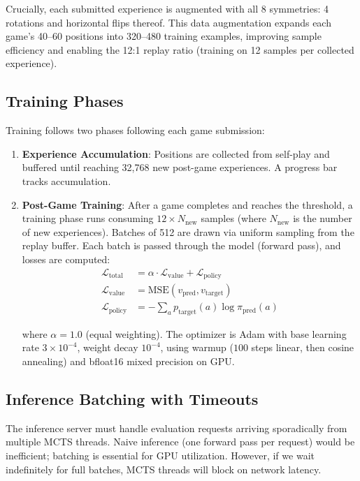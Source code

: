 \documentclass[12pt]{article}
\begin{document}
Crucially, each submitted experience is augmented with all 8 symmetries: 4 rotations and horizontal flips thereof. This data augmentation expands each game's 40--60 positions into 320--480 training examples, improving sample efficiency and enabling the 12:1 replay ratio (training on 12 samples per collected experience).

\subsection{Training Phases}

Training follows two phases following each game submission:

\begin{enumerate}
    \item \textbf{Experience Accumulation}: Positions are collected from self-play and buffered until reaching 32,768 new post-game experiences. A progress bar tracks accumulation.
    \item \textbf{Post-Game Training}: After a game completes and reaches the threshold, a training phase runs consuming $12 \times N_{\text{new}}$ samples (where $N_{\text{new}}$ is the number of new experiences). Batches of 512 are drawn via uniform sampling from the replay buffer. Each batch is passed through the model (forward pass), and losses are computed:
    \begin{align}
        \mathcal{L}_{\text{total}} &= \alpha \cdot \mathcal{L}_{\text{value}} + \mathcal{L}_{\text{policy}} \\
        \mathcal{L}_{\text{value}} &= \text{MSE}(v_{\text{pred}}, v_{\text{target}}) \\
        \mathcal{L}_{\text{policy}} &= -\sum_{a} p_{\text{target}}(a) \log \pi_{\text{pred}}(a)
    \end{align}

    where $\alpha = 1.0$ (equal weighting). The optimizer is Adam with base learning rate $3 \times 10^{-4}$, weight decay $10^{-4}$, using warmup ($100$ steps linear, then cosine annealing) and bfloat16 mixed precision on GPU.
\end{enumerate}

\subsection{Inference Batching with Timeouts}

The inference server must handle evaluation requests arriving sporadically from multiple MCTS threads. Naive inference (one forward pass per request) would be inefficient; batching is essential for GPU utilization. However, if we wait indefinitely for full batches, MCTS threads will block on network latency.
\end{document}

